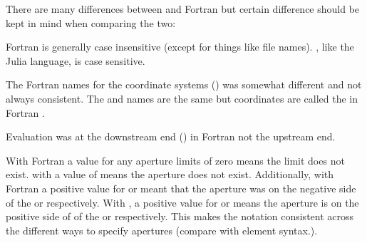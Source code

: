 There are many differences between \accellat and Fortran \bmad but certain difference should
be kept in mind when comparing the two:
\begin{description}
\item
Fortran \bmad is generally case insensitive (except for things like file names). \accellat, like
the Julia language, is case sensitive.
%
\item
The Fortran \bmad names for the coordinate systems () was somewhat different and not
always consistent. The  and  names are the same but 
coordinates are called the  in Fortran \bmad.
%
\item
Evaluation was at the downstream end () in Fortran \bmad not the upstream end.
%
\item
With Fortran \bmad a value for any aperture limits of zero means the limit does not exist.
with \accellat a value of  means the aperture does not exist. Additionally, with
Fortran \bmad a positive value for  or  meant that the aperture was
on the negative side of the  or  respectively. With \accellat, a positive
value for  or  means the aperture is on the positive side of 
of the  or  respectively. This makes the notation consistent across 
the different ways to specify apertures (compare with  element syntax.).
\end{description}



